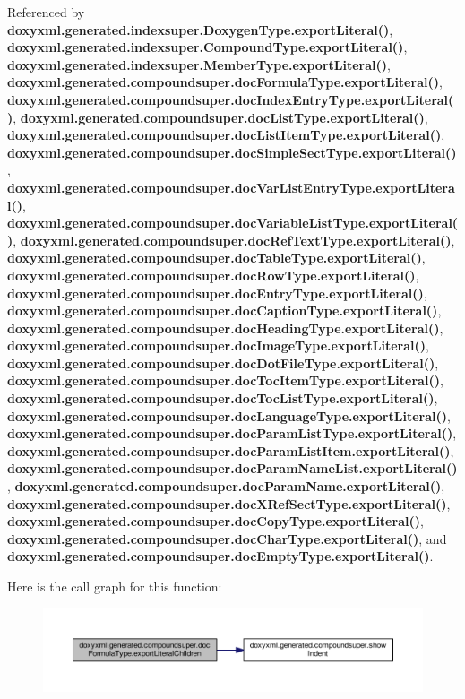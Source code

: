 Referenced by {\bf doxyxml.\+generated.\+indexsuper.\+Doxygen\+Type.\+export\+Literal()}, {\bf doxyxml.\+generated.\+indexsuper.\+Compound\+Type.\+export\+Literal()}, {\bf doxyxml.\+generated.\+indexsuper.\+Member\+Type.\+export\+Literal()}, {\bf doxyxml.\+generated.\+compoundsuper.\+doc\+Formula\+Type.\+export\+Literal()}, {\bf doxyxml.\+generated.\+compoundsuper.\+doc\+Index\+Entry\+Type.\+export\+Literal()}, {\bf doxyxml.\+generated.\+compoundsuper.\+doc\+List\+Type.\+export\+Literal()}, {\bf doxyxml.\+generated.\+compoundsuper.\+doc\+List\+Item\+Type.\+export\+Literal()}, {\bf doxyxml.\+generated.\+compoundsuper.\+doc\+Simple\+Sect\+Type.\+export\+Literal()}, {\bf doxyxml.\+generated.\+compoundsuper.\+doc\+Var\+List\+Entry\+Type.\+export\+Literal()}, {\bf doxyxml.\+generated.\+compoundsuper.\+doc\+Variable\+List\+Type.\+export\+Literal()}, {\bf doxyxml.\+generated.\+compoundsuper.\+doc\+Ref\+Text\+Type.\+export\+Literal()}, {\bf doxyxml.\+generated.\+compoundsuper.\+doc\+Table\+Type.\+export\+Literal()}, {\bf doxyxml.\+generated.\+compoundsuper.\+doc\+Row\+Type.\+export\+Literal()}, {\bf doxyxml.\+generated.\+compoundsuper.\+doc\+Entry\+Type.\+export\+Literal()}, {\bf doxyxml.\+generated.\+compoundsuper.\+doc\+Caption\+Type.\+export\+Literal()}, {\bf doxyxml.\+generated.\+compoundsuper.\+doc\+Heading\+Type.\+export\+Literal()}, {\bf doxyxml.\+generated.\+compoundsuper.\+doc\+Image\+Type.\+export\+Literal()}, {\bf doxyxml.\+generated.\+compoundsuper.\+doc\+Dot\+File\+Type.\+export\+Literal()}, {\bf doxyxml.\+generated.\+compoundsuper.\+doc\+Toc\+Item\+Type.\+export\+Literal()}, {\bf doxyxml.\+generated.\+compoundsuper.\+doc\+Toc\+List\+Type.\+export\+Literal()}, {\bf doxyxml.\+generated.\+compoundsuper.\+doc\+Language\+Type.\+export\+Literal()}, {\bf doxyxml.\+generated.\+compoundsuper.\+doc\+Param\+List\+Type.\+export\+Literal()}, {\bf doxyxml.\+generated.\+compoundsuper.\+doc\+Param\+List\+Item.\+export\+Literal()}, {\bf doxyxml.\+generated.\+compoundsuper.\+doc\+Param\+Name\+List.\+export\+Literal()}, {\bf doxyxml.\+generated.\+compoundsuper.\+doc\+Param\+Name.\+export\+Literal()}, {\bf doxyxml.\+generated.\+compoundsuper.\+doc\+X\+Ref\+Sect\+Type.\+export\+Literal()}, {\bf doxyxml.\+generated.\+compoundsuper.\+doc\+Copy\+Type.\+export\+Literal()}, {\bf doxyxml.\+generated.\+compoundsuper.\+doc\+Char\+Type.\+export\+Literal()}, and {\bf doxyxml.\+generated.\+compoundsuper.\+doc\+Empty\+Type.\+export\+Literal()}.



Here is the call graph for this function\+:
\nopagebreak
\begin{figure}[H]
\begin{center}
\leavevmode
\includegraphics[width=350pt]{d5/d88/classdoxyxml_1_1generated_1_1compoundsuper_1_1docFormulaType_a98339437a1dbf8648a80522bec9e5646_cgraph}
\end{center}
\end{figure}




